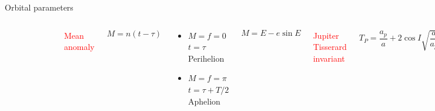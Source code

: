 \documentclass{beamer}
\begin{document}
\begin{frame}{Orbital parameters}
\begin{columns}
\begin{figure}[h]
\begin{center}
\includegraphics[width=\textwidth ]{Pic/Mean_anomaly.png}
\caption{\cite{murray1999solar}}
\label{Area_dynamics}
\end{center}
\end{figure}
\begin{center}
\textcolor{red}{Mean anomaly}
\end{center}
\begin{equation}
M=n(t-\tau)
\end{equation}

\begin{center}
\begin{itemize}
\item $M=f=0$\quad$t=\tau$\quad Perihelion
\item $M=f=\pi$\quad$t=\tau+T/2$ \quad Aphelion
\end{itemize}
\end{center}

\begin{equation}
M=E-e\sin E
\end{equation}
\begin{center}
\textcolor{red}{Jupiter Tisserard invariant }
\end{center}
\begin{equation}
T_{P}=\frac{a_{p}}{a}+2\cos I\sqrt{\dfrac{a}{a_{p}}(1-e^{2})}
\end{equation}
\end{columns}
\end{frame}
\end{document}
